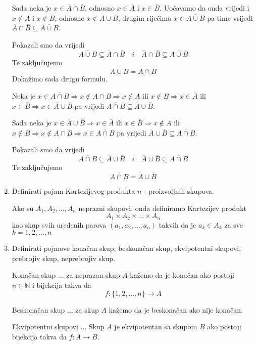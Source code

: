 \documentclass{article}
\begin{document}
\begin{enumerate}
Sada neka je $x\in\overline{A}\cap\overline{B}$, odnosno $x\in\overline{A}$ i $x\in\overline{B}$. Uočavamo da onda vrijedi i $x\notin A$ i $x\notin B$, odnosno $x\notin A\cup B$, drugim riječima $x\in\overline{A\cup B}$ pa time vrijedi $\overline{A}\cap\overline{B}\subseteq\overline{A\cup B}$.

Pokazali smo da vrijedi
$$\overline{A\cup B}\subseteq\overline{A}\cap\overline{B}\quad i \quad \overline{A}\cap\overline{B}\subseteq\overline{A\cup B}$$
Te zaključujemo
$$\overline{A\cup B} = \overline{A}\cap\overline{B}$$
Dokažimo sada drugu formulu.

Neka je $x\in\overline{A\cap B} \Longrightarrow x\notin A\cap B \Longrightarrow x \notin A$ ili $x\notin B\Longrightarrow x\in\overline{A}$ ili $x\in\overline{B}\Longrightarrow x\in\overline{A}\cup\overline{B}$ pa vrijedi $\overline{A\cap B}\subseteq\overline{A}\cup\overline{B}$.

Sada neka je $x\in\overline{A}\cup\overline{B}\Longrightarrow x\in\overline{A}$ ili $x\in\overline{B}\Longrightarrow x\notin A$ ili $x\notin B\Longrightarrow x\notin A\cap B\Longrightarrow x\in\overline{A\cap B}$ pa vrijedi $\overline{A}\cup\overline{B}\subseteq\overline{A\cap B}$.

Pokazali smo da vrijedi
$$\overline{A\cap B}\subseteq\overline{A}\cup\overline{B} \quad i \quad \overline{A}\cup\overline{B}\subseteq\overline{A\cap B}$$
Te zaključujemo
$$\overline{A\cap B} = \overline{A}\cup\overline{B}$$

\item Definirati pojam Kartezijevog produkta  $n$ - proizvoljnih skupova.

Ako su $A_1, A_2, \ldots, A_n$ neprazni skupovi, onda definiramo Kartezijev produkt
$$A_1 \times A_2 \times\ldots\times A_n$$
kao skup svih uređenih parova $(a_1, a_2, \ldots, a_n)$ takvih da je $a_k\in A_k$ za sve $k = 1, 2, \ldots, n$

\item Definirati pojmove konačan skup, beskonačan skup, ekvipotentni skupovi, prebrojiv skup, neprebrojiv skup.

Konačan skup ... za neprazan skup $A$ kažemo da je konačan ako postoji $n\in\mathbb{N}$ i bijekcija takva da $$f: \{1, 2, \ldots, n\}\to A$$

Beskonačan skup ... za skup $A$ kažemo da je beskonačan ako nije konačan.

Ekvipotentni skupovi ... Skup $A$ je ekvipotentan sa skupom $B$ ako postoji bijekcija takva da $f: A\to B$.


\end{enumerate}
\end{document}
